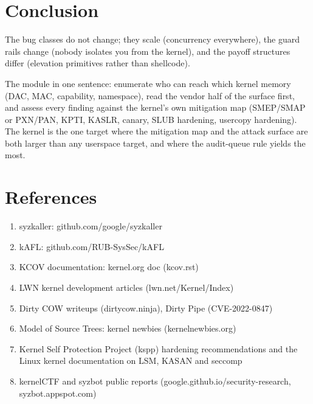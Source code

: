 \documentclass[12pt]{Training}
\begin{document}
\section*{Conclusion}
The bug classes do not change; they scale (concurrency everywhere), the guard rails change (nobody isolates you from the kernel), and the payoff structures differ (elevation primitives rather than shellcode).

The module in one sentence: enumerate who can reach which kernel memory (DAC, MAC, capability, namespace), read the vendor half of the surface first, and assess every finding against the kernel's own mitigation map (SMEP/SMAP or PXN/PAN, KPTI, KASLR, canary, SLUB hardening, usercopy hardening). The kernel is the one target where the mitigation map and the attack surface are both larger than any userspace target, and where the audit-queue rule yields the most.

\section*{References}
\begin{enumerate}
	\item syzkaller: github.com/google/syzkaller
	\item kAFL: github.com/RUB-SysSec/kAFL
	\item KCOV documentation: kernel.org doc (kcov.rst)
	\item LWN kernel development articles (lwn.net/Kernel/Index)
	\item Dirty COW writeups (dirtycow.ninja), Dirty Pipe (CVE-2022-0847)
	\item Model of Source Trees: kernel newbies (kernelnewbies.org)
	\item Kernel Self Protection Project (kspp) hardening recommendations and the Linux kernel documentation on LSM, KASAN and seccomp
	\item kernelCTF and syzbot public reports (google.github.io/security-research, syzbot.appspot.com)
\end{enumerate}
\end{document}
